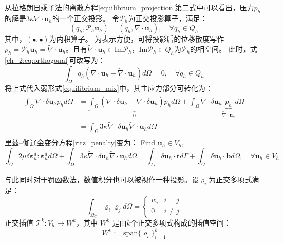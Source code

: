 从拉格朗日乘子法的离散方程\eqref{equilibrium_projection}第二式中可以看出，压力$p_h$的解是$3\kappa \nabla \cdot \boldsymbol u_h$的一个正交投影。
令$\mathcal P_h$为正交投影算子，满足：
\begin{equation}\label{ch_2:eq:orthogonal}
    (q_h,\mathcal P_h \boldsymbol u_h) = (q_h, \nabla \cdot \boldsymbol u_h), \quad \forall q_h \in Q_h
\end{equation}
其中，$(\bullet,\bullet)$为内积算子。
为表示方便，可将投影后的位移散度写作$p_h=\mathcal P_h \boldsymbol u_h = \tilde \nabla \cdot \boldsymbol u_h$。且有$\tilde \nabla \cdot \boldsymbol u_h \in \mathrm{Im} \mathcal P_h$，$\mathrm{Im} \mathcal P_h \in Q_h$为$\mathcal P_h$的相空间\cite{philippeg.2013}。
此时，式\eqref{ch_2:eq:orthogonal}可改写为：
\begin{equation}
    \int_\Omega q_h(\nabla \cdot \boldsymbol u_h - \tilde \nabla \cdot \boldsymbol u_h) d\Omega = 0, \quad \forall q_h \in Q_h
\end{equation}
将上式代入弱形式\eqref{equilibrium_mix}中，其主应力部分可转化为：
\begin{equation}\label{projection_mixed}
    \begin{split}
        \int_\Omega \nabla \cdot \delta \boldsymbol u_h p_h d\Omega &= \underbrace{\int_\Omega (\nabla \cdot \delta  \boldsymbol u_h - \tilde \nabla \cdot \delta \boldsymbol u_h) p_h d\Omega}_0 + \int_\Omega \tilde \nabla \cdot \delta \boldsymbol u_h \underbrace{p_h}_{\tilde \nabla \cdot \boldsymbol u_h} d\Omega \\
        &= \int_\Omega 3\kappa \tilde \nabla \cdot \delta \boldsymbol u_h \tilde \nabla \cdot \boldsymbol u_h d\Omega \\
    \end{split}
\end{equation}
里兹--伽辽金变分方程\eqref{ritz_penalty}变为：
Find $\boldsymbol u_h \in V_h$,
\begin{equation}\label{ritz_mix}
    \int_\Omega 2\mu \delta \boldsymbol \varepsilon^d_h : \boldsymbol \varepsilon^d_h d\Omega +
    \int_\Omega 3\kappa \tilde \nabla \cdot \delta \boldsymbol u_h \tilde \nabla \cdot \boldsymbol u_h d\Omega =
    \int_{\Gamma_t} \delta \boldsymbol u_h \cdot \boldsymbol t d\Gamma + \int_\Omega \delta \boldsymbol u_h \cdot \boldsymbol b d\Omega, \quad \forall \boldsymbol u_h \in V_h
\end{equation}

与此同时对于罚函数法，数值积分也可以被视作一种投影。设$\varrho_i$为正交多项式满足：
\begin{equation}
    \int_{\Omega_C} \varrho_i \varrho_j d\Omega = 
    \begin{cases}
        w_i  & i = j \\
        0 & i \ne j
    \end{cases}
\end{equation}
正交插值 $\mathcal T^{k}: V_h \rightarrow W^{k}$，其中 $W^{k}$ 是由$k$个正交多项式构成的插值空间：
\begin{equation}
    W^{k}:= \mathrm{span}\{\varrho_i \}_{i=1}^{k}
\end{equation}

